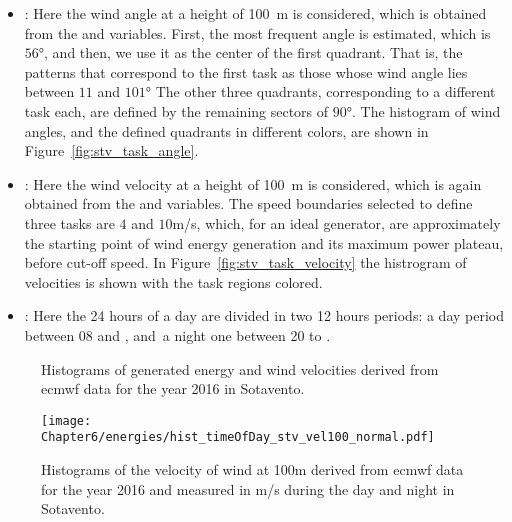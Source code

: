 \begin{itemize}
    \item {}: Here the wind angle at a height of \si{100\metre} is considered, which is obtained from the  and  variables. 
    First, the most frequent angle is estimated, which is $\ang{56}$, and then, we use it as the center of the first quadrant. That is, the patterns that correspond to the first task as those whose wind angle lies between ${11}$ and $\ang{101}$  The other three quadrants, corresponding to a different task each, are defined by the remaining sectors of $\ang{90}$.
    The histogram of wind angles, and the defined quadrants in different colors, are shown in Figure~\ref{fig:stv_task_angle}.
    \item {}: Here the wind velocity at a height of \si{100\metre} is considered, which is again obtained from the  and  variables. The speed boundaries selected to define three tasks are $4$ and $10$m/s, which, for an ideal generator, are approximately the starting point of wind energy generation and its maximum power plateau, before cut-off speed.   
    In Figure~\ref{fig:stv_task_velocity} the histrogram of velocities is shown with the task regions colored. 
    \item {}: Here the 24 hours of a day are divided in two 12 hours periods: a day period between 08 and , and~a night one between 20 to .
\end{itemize}

\begin{figure}[t!]
    \centering
    \quad%
 \caption{\label{fig:wind_task_def} Histograms of generated energy and wind velocities derived from \acrshort{ecmwf} data for the year 2016 in Sotavento.}
 \end{figure}

 
\begin{figure}[t!]
    \centering
    \texttt{[image: Chapter6/energies/hist\_timeOfDay\_stv\_vel100\_normal.pdf]}
  \caption{\label{fig:stv_vel100} Histograms of the velocity of wind at 100m derived from \acrshort{ecmwf} data for the year 2016 and measured in m/s during the day and night in Sotavento.
 }
 \end{figure}

